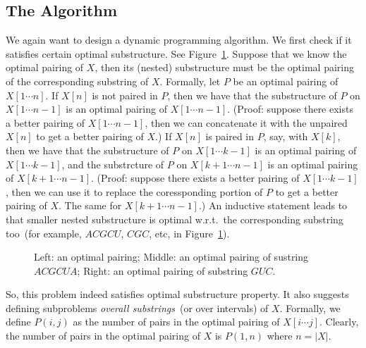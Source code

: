 \subsection*{The Algorithm}

We again want to design a dynamic programming algorithm.
We first check if it satisfies certain optimal substructure.
See Figure~\ref{fig:optimal}.
Suppose that we know the optimal pairing of $X$,
then its (nested) substructure must be the optimal
pairing of the corresponding substring of $X$.
Formally, let $P$ be an optimal pairing of $X[1\cdots n]$.
If $X[n]$ is not paired in $P$, then we have that
the substructure of $P$ on $X[1\cdots n - 1]$ is an optimal
pairing of $X[1\cdots n - 1]$. (Proof: suppose there exists
a better pairing of $X[1\cdots n - 1]$, then we can concatenate
it with the unpaired $X[n]$ to get a better pairing of $X$.)
If $X[n]$ is paired in $P$, say, with $X[k]$, then we have that
the substructure of $P$ on $X[1\cdots k - 1]$ is an optimal
pairing of $X[1\cdots k - 1]$, and 
the substrcture of $P$ on $X[k + 1\cdots n - 1]$ is an optimal
pairing of $X[k + 1\cdots n - 1]$. 
(Proof: suppose there exists
a better pairing of $X[1\cdots k - 1]$, then we can use it to replace
the coressponding portion of $P$ to 
get a better pairing of $X$. The same for $X[k + 1\cdots n - 1]$.)
An inductive statement leads to that smaller nested substructure
is optimal w.r.t.\ the corresponding substring too~(for example, 
		$ACGCU$, $CGC$, etc, in Figure~\ref{fig:optimal}).

\begin{figure}[h]
\centering{}
\caption{Left: an optimal pairing; Middle: an optimal pairing of sustring $ACGCUA$; Right: 
an optimal pairing of substring $GUC$.}
\label{fig:optimal}
\end{figure}

So, this problem indeed satisfies optimal substructure property.
It also suggests defining subproblems \emph{overall substrings}~(or over intervals) of $X$.
Formally, we define $P(i,j)$ as the number of pairs in the optimal pairing of $X[i\cdots j]$.
Clearly, the number of pairs in the optimal pairing of $X$ is $P(1,n)$ where $n = |X|$.

